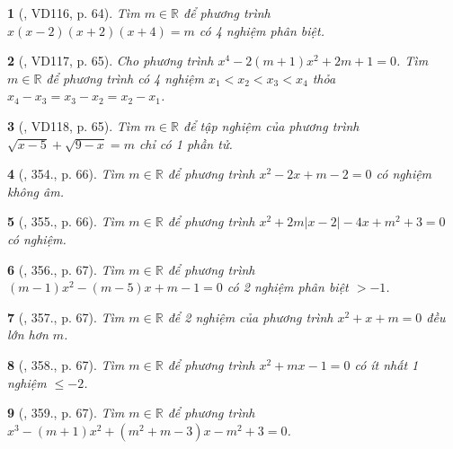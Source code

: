 \documentclass{article}
\newtheorem{baitoan}{}
\begin{document}
\begin{baitoan}[\cite{Binh_Toan_9_tap_2}, VD116, p. 64]
	Tìm $m\in\mathbb{R}$ để phương trình $x(x - 2)(x + 2)(x + 4) = m$ có 4 nghiệm phân biệt.
\end{baitoan}

\begin{baitoan}[\cite{Binh_Toan_9_tap_2}, VD117, p. 65]
	Cho phương trình $x^4 - 2(m + 1)x^2 + 2m + 1 = 0$. Tìm $m\in\mathbb{R}$ để phương trình có 4 nghiệm $x_1 < x_2 < x_3 < x_4$ thỏa $x_4 - x_3 = x_3 - x_2 = x_2 - x_1$.
\end{baitoan}

\begin{baitoan}[\cite{Binh_Toan_9_tap_2}, VD118, p. 65]
	Tìm $m\in\mathbb{R}$ để tập nghiệm của phương trình $\sqrt{x - 5} + \sqrt{9 - x} = m$ chỉ có 1 phần tử.
\end{baitoan}

\begin{baitoan}[\cite{Binh_Toan_9_tap_2}, 354., p. 66]
	Tìm $m\in\mathbb{R}$ để phương trình $x^2 - 2x + m - 2 = 0$ có nghiệm không âm.
\end{baitoan}

\begin{baitoan}[\cite{Binh_Toan_9_tap_2}, 355., p. 66]
	Tìm $m\in\mathbb{R}$ để phương trình $x^2 + 2m|x - 2| - 4x + m^2 + 3 = 0$ có nghiệm.
\end{baitoan}

\begin{baitoan}[\cite{Binh_Toan_9_tap_2}, 356., p. 67]
	Tìm $m\in\mathbb{R}$ để phương trình $(m - 1)x^2 - (m - 5)x + m - 1 = 0$ có 2 nghiệm phân biệt $> -1$.
\end{baitoan}

\begin{baitoan}[\cite{Binh_Toan_9_tap_2}, 357., p. 67]
	Tìm $m\in\mathbb{R}$ để 2 nghiệm của phương trình $x^2 + x + m = 0$ đều lớn hơn $m$.
\end{baitoan}

\begin{baitoan}[\cite{Binh_Toan_9_tap_2}, 358., p. 67]
	Tìm $m\in\mathbb{R}$ để phương trình $x^2 + mx - 1 = 0$ có ít nhất 1 nghiệm $\le-2$.
\end{baitoan}

\begin{baitoan}[\cite{Binh_Toan_9_tap_2}, 359., p. 67]
	Tìm $m\in\mathbb{R}$ để phương trình $x^3 - (m + 1)x^2 + (m^2 + m - 3)x - m^2 + 3 = 0$.
\end{baitoan}
\end{document}
